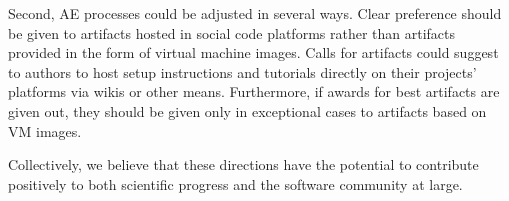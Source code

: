 \documentclass{sigplanconf}
\begin{document}
Second, AE processes could be adjusted in several ways. Clear preference
should be given to artifacts hosted in social code platforms rather than
artifacts provided in the form of virtual machine images. Calls for artifacts
could suggest to authors to host setup instructions and tutorials directly on
their projects' platforms via wikis or other means. Furthermore, if awards for
best artifacts are given out, they should be given only in exceptional cases
to artifacts based on VM images.

Collectively, we believe that these directions have the potential to
contribute positively to both scientific progress and the software community
at large.






\end{document}

